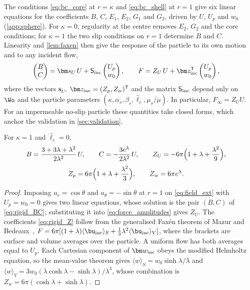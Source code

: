 The conditions \eqref{eq:bc_core} at $r=\kappa$ and \eqref{eq:bc_shell} at $r=1$ give six linear equations for the
coefficients $B$, $C$, $E_1$, $E_2$, $G_1$ and $G_2$, driven by $U$, $U_p$ and $w_0$ (\cref{app:sphere}). For $\kappa=0$, regularity at the centre
removes $E_2$, $G_2$ and the core conditions; for $\kappa=1$ the two slip conditions on $r=1$ determine $B$ and $C$.
Linearity and \cref{lem:faxen} then give the response of the particle to its own motion and to any incident flow,
\begin{equation}
  \begin{pmatrix}B\\ C\end{pmatrix}=\bm s_U\,U+\mathsf S_{\rm inc}\begin{pmatrix}U_p\\ w_0\end{pmatrix},
  \qquad
  F=Z_U\,U+\bm z_{\rm inc}^{\mathsf T}\begin{pmatrix}U_p\\ w_0\end{pmatrix},
  \label{eq:response}
\end{equation}
where the vectors $\bm s_U$, $\bm z_{\rm inc}=(Z_p,Z_w)^{\mathsf T}$ and the matrix $\mathsf S_{\rm inc}$ depend only on
$\Wo$ and the particle parameters $(\kappa,\alpha_s,\beta_s,\hat\ell_c,\mu_s/\mu)$. In particular, $F_\infty=Z_UU$. For
an impermeable no-slip particle these quantities take closed forms, which anchor the validation in
\cref{sec:validation}.

\begin{proposition}\label{prop:rigid}
For $\kappa=1$ and $\hat\ell_c=0$,
\begin{equation}
  B=\frac{3+3\lambda+\lambda^2}{2\lambda^2}\,U,\qquad C=-\frac{3e^{\lambda}}{2\lambda^2}\,U,\qquad
  Z_U=-6\pi\Bigl(1+\lambda+\frac{\lambda^2}{9}\Bigr),
  \label{eq:rigid_BC}
\end{equation}
\begin{equation}
  Z_p=6\pi\Bigl(1+\lambda+\frac{\lambda^2}{3}\Bigr),\qquad Z_w=6\pi e^{\lambda}.
  \label{eq:rigid_Z}
\end{equation}
\end{proposition}
\begin{proof}
Imposing $u_r=\cos\theta$ and $u_\theta=-\sin\theta$ at $r=1$ on \cref{eq:field_ext} with $U_p=w_0=0$ gives two linear
equations, whose solution is the pair $(B,C)$ of \cref{eq:rigid_BC}; substituting it into \cref{eq:force_amplitudes}
gives $Z_U$. The coefficients \eqref{eq:rigid_Z} follow from the generalised Faxén theorem of Mazur and
Bedeaux~\cite{mazur1974generalization}, $F=6\pi[(1+\lambda)\langle\bu_{\rm inc}\rangle_S+\tfrac13\lambda^2\langle\bu_{\rm
inc}\rangle_V]$, where the brackets are surface and volume averages over the particle. A uniform flow has both averages
equal to $U_p$. Each Cartesian component of $\bm w_{\rm inc}$ obeys the modified Helmholtz equation, so the mean-value
theorem gives $\langle w\rangle_S=w_0\sinh\lambda/\lambda$ and $\langle w\rangle_V=3w_0(\lambda\cosh\lambda-\sinh\lambda)/\lambda^3$,
whose combination is $Z_w=6\pi(\cosh\lambda+\sinh\lambda)$.
\end{proof}

